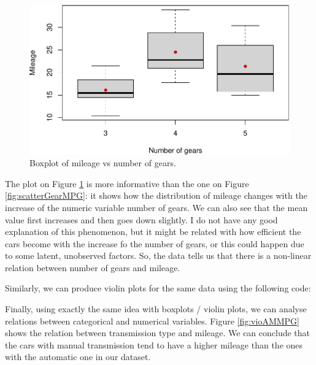 \documentclass[
]{book}
\newenvironment{Shaded}{\begin{snugshade}}{\end{snugshade}}
\newcommand{\DataTypeTok}[1]{\textcolor[rgb]{0.13,0.29,0.53}{#1}}
\newcommand{\DecValTok}[1]{\textcolor[rgb]{0.00,0.00,0.81}{#1}}
\newcommand{\KeywordTok}[1]{\textcolor[rgb]{0.13,0.29,0.53}{\textbf{#1}}}
\newcommand{\NormalTok}[1]{#1}
\newcommand{\OperatorTok}[1]{\textcolor[rgb]{0.81,0.36,0.00}{\textbf{#1}}}
\newcommand{\StringTok}[1]{\textcolor[rgb]{0.31,0.60,0.02}{#1}}
\theoremstyle{definition}
\theoremstyle{definition}
\theoremstyle{definition}
\theoremstyle{definition}
\theoremstyle{remark}
\begin{document}
\begin{figure}
\centering
\includegraphics{Svetunkov---Statistics-for-Business-Analytics_files/figure-latex/boxGearMPG-1.pdf}
\caption{\label{fig:boxGearMPG}Boxplot of mileage vs number of gears.}
\end{figure}

The plot on Figure \ref{fig:boxGearMPG} is more informative than the one on Figure \ref{fig:scatterGearMPG}: it shows how the distribution of mileage changes with the increase of the numeric variable number of gears. We can also see that the mean value first increases and then goes down slightly. I do not have any good explanation of this phenomenon, but it might be related with how efficient the cars become with the increase fo the number of gears, or this could happen due to some latent, unobserved factors. So, the data tells us that there is a non-linear relation between number of gears and mileage.

Similarly, we can produce violin plots for the same data using the following code:

\begin{Shaded}
\end{Shaded}

Finally, using exactly the same idea with boxplots / violin plots, we can analyse relations between categorical and numerical variables. Figure \ref{fig:vioAMMPG} shows the relation between transmission type and mileage. We can conclude that the cars with manual transmission tend to have a higher mileage than the ones with the automatic one in our dataset.
\end{document}
